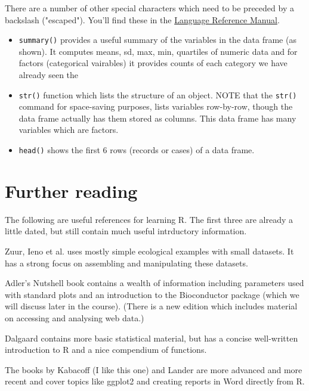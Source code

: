 \documentclass[titlepage]{book}\usepackage{knitr}
\begin{document}
There are a number of other special characters which need to be preceded by a backslash ("escaped").  You'll find these in the \href{https://cran.r-project.org/doc/manuals/r-release/R-lang.html#Literal-constants}{Language Reference Manual}.


\begin{itemize}
\item{\texttt{summary()} provides a useful summary of the variables in the data frame (as shown). It computes means, sd, max, min, quartiles of numeric data and for factors (categorical vairables) it provides counts of each category}
 we have already seen the \item{\texttt{str()} function which lists the structure of an object. NOTE that the \texttt{str()} command for space-saving purposes, lists  variables row-by-row, though the data frame actually has them stored as columns. This data frame has many variables which are factors. }
 \item{\texttt{head()} shows the first 6 rows (records or cases) of a data frame.}
\end{itemize}






\section{Further reading}
The following are useful references for learning R. The first three are already a little dated, but still contain much useful intrductory information.

Zuur, Ieno et al.\cite{Zuur2009a} uses mostly simple ecological examples with small datasets. It has a strong focus on assembling and manipulating these datasets.

Adler's Nutshell book\cite{Adler2010} contains a wealth of information including parameters used with standard plots and an introduction to the Bioconductor package (which we will discuss later in the course). (There is a new edition which includes material on accessing and analysing web data.)

Dalgaard \cite{Dalgaard2008} contains more basic statistical material, but has a concise well-written introduction to R and a nice compendium of functions.

The books by Kabacoff \cite{Kabacoff2014} (I like this one) and Lander \cite{Lander2014} are more advanced and more recent and cover topics like ggplot2 and creating reports in Word directly from R.
\end{document}
